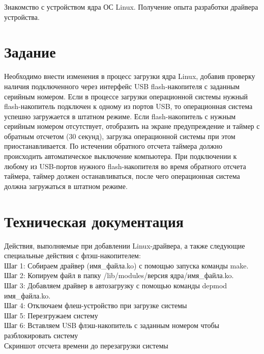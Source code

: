 \documentclass[a4paper]{article}
\begin{document}
Знакомство с устройством ядра ОС Linux. Получение опыта разработки драйвера устройства.

\section{Задание}

Необходимо внести изменения в процесс загрузки ядра Linux, добавив проверку наличия
подключенного через интерфейс USB flash-накопителя с заданным серийным номером.
Если в процессе загрузки операционной системы нужный flash-накопитель подключен к
одному из портов USB, то операционная система успешно загружается в штатном режиме.
Если flash-накопитель с нужным серийным номером отсутствует, отобразить на экране
предупреждение и таймер с обратным отсчетом (30 секунд), загрузка операционной
системы при этом приостанавливается. По истечении обратного отсчета таймера должно
происходить автоматическое выключение компьютера. При подключении к любому из
USB-портов нужного flash-накопителя во время обратного отсчета таймера, таймер должен
останавливаться, после чего операционная система должна загружаться в штатном
режиме.

\section{Техническая документация}


Действия, выполняемые при добавлении Linux-драйвера, а также следующие специальные действия с флэш-накопителем:\\

Шаг 1: Собираем драйвер (имя\_файла.ko) с помощью запуска команды make.\\

Шаг 2: Копируем файл в папку /lib/modules/версия ядра/имя\_файла.ko.\\

Шаг 3: Добавляем драйвер в автозагрузку с помощью команды depmod имя\_файла.ko.\\

Шаг 4: Отключаем флеш-устройство при загрузке системы\\

Шаг 5: Перезгружаем систему\\

Шаг 6: Вставляем USB флэш-накопитель с заданным номером чтобы разблокировать систему\\

Скриншот отсчета времени до перезагрузки системы\\
\end{document}
